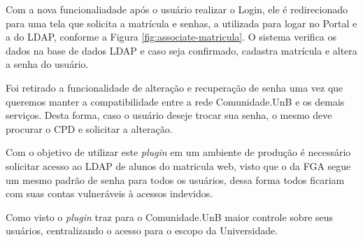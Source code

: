 Com a nova funcionaliadade após o usuário realizar o Login, ele é redirecionado para uma tela que solicita a matrícula e senhas, a utilizada para logar no Portal e a do LDAP, conforme a Figura \ref{fig:associate-matricula}. O sistema verifica os dados na base de dados LDAP e caso seja confirmado, cadastra matrícula e altera a senha do usuário.

Foi retirado a funcionalidade de alteração e recuperação de senha uma vez que queremos manter a compatibilidade entre a rede Comunidade.UnB e os demais serviços. Desta forma, caso o usuário deseje trocar sua senha, o mesmo deve procurar o CPD e solicitar a alteração.

Com o objetivo de utilizar este \textit{plugin} em um ambiente de produção é necessário solicitar acesso ao LDAP de alunos do matricula web, visto que o da FGA segue um mesmo padrão de senha para todos os usuários, dessa forma todos ficariam com suas contas vulneráveis à acessos indevidos.

Como visto o \textit{plugin} traz para o Comunidade.UnB maior controle sobre seus usuários, centralizando o acesso para o escopo da Universidade.
